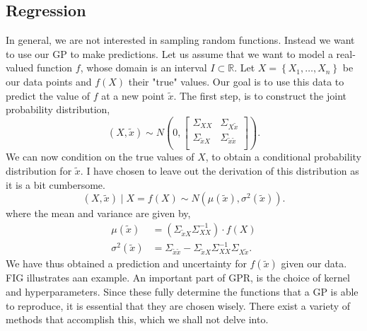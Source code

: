 \documentclass[working, oneside]{../../../Preambles/marginclass}
\begin{document}
\subsection{Regression}
In general, we are not interested in sampling random functions. Instead we want to use our GP to make predictions. Let us assume that we want to model a real-valued function $f$, whose domain is an interval $I \subset \mathbb{R}$. Let $X = \left\{ X_1, \ldots, X_n \right\}$ be our data points and $f\left( X \right) $ their "true" values. Our goal is to use this data to predict the value of $f$ at a new point $\widetilde{x}$. The first step, is to construct the joint probability distribution,
\[
\left( X, \widetilde{x} \right) \sim N\left( 0, 
\begin{bmatrix}
    \Sigma_{XX} & \Sigma_{X\widetilde{x}} \\
     \Sigma_{\widetilde{x}X}&  \Sigma_{\widetilde{x}\widetilde{x}}\\
\end{bmatrix}\right) 
.\]
We can now condition on the true values of $X$, to obtain a conditional probability distribution for $\widetilde{x}$. I have chosen to leave out the derivation of this distribution as it is a bit cumbersome.
 \[
\left( X, \widetilde{x} \right) \mid X = f\left( X \right) \sim N\left( \mu\left( \widetilde{x}\right) , \sigma^2\left( \widetilde{x} \right)  \right) 
.\] 
where the mean and variance are given by,
\begin{align*}
    \mu \left( \widetilde{x} \right) &= \left(   \Sigma_{\widetilde{x}X}\Sigma_{XX}^{-1}\right) \cdot  f\left( X \right) \\
    \sigma^2 \left( \widetilde{x} \right) &= \Sigma_{\widetilde{x}\widetilde{x}} - \Sigma_{\widetilde{x}X}\Sigma_{XX}^{-1}\Sigma_{X\widetilde{x}}
.\end{align*}
We have thus obtained a prediction and uncertainty for $f\left( \widetilde{x} \right) $ given our data. FIG illustrates aan example. An important part of GPR, is the choice of kernel and hyperparameters. Since these fully determine the functions that a GP is able to reproduce, it is essential that they are chosen wisely. There exist a variety of methods that accomplish this, which we shall not delve into.
\end{document}
